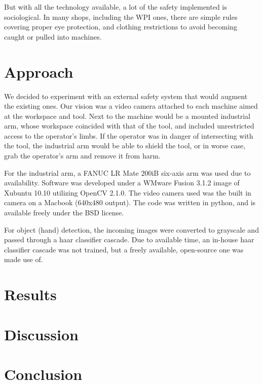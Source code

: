 \documentclass[12pt]{article}
\begin{document}
But with all the technology available, a lot of the safety implemented is sociological. In many shops, including the WPI ones, there are simple rules covering proper eye protection, and clothing restrictions to avoid becoming caught or pulled into machines\cite{WPI:safety}.

\section{Approach}
We decided to experiment with an external safety system that would augment the existing ones. Our vision was a video camera attached to each machine aimed at the workspace and tool. Next to the machine would be a mounted industrial arm, whose workspace coincided with that of the tool, and included unrestricted access to the operator's limbs. If the operator was in danger of intersecting with the tool, the industrial arm would be able to shield the tool, or in worse case, grab the operator's arm and remove it from harm.


For the industrial arm, a FANUC LR Mate 200iB six-axis arm was used due to availability\cite{fanuc}. Software was developed under a WMware Fusion 3.1.2 image of Xubuntu 10.10 utilizing OpenCV 2.1.0. The video camera used was the built in camera on a Macbook (640x480 output). The code was written in python, and is available freely under the BSD license\cite{google-code}.

For object (hand) detection, the incoming images were converted to grayscale and passed through a haar classifier cascade. Due to available time, an in-house haar classifier cascade was not trained, but a freely available, open-source one was made use of\cite{haar-hands}.

\section{Results}


\section{Discussion}


\section{Conclusion}




\end{document}
